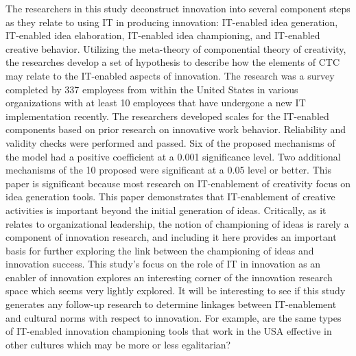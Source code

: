 \begin{adjustwidth}{1in}{}
  \begin{hangpara}{.25in}{1}
\end{hangpara}
\end{adjustwidth}
The researchers in this study deconstruct innovation into several component steps as they relate to using IT in producing innovation: IT-enabled idea generation, IT-enabled idea elaboration, IT-enabled idea championing, and IT-enabled creative behavior. Utilizing the meta-theory of componential theory of creativity, the researches develop a set of hypothesis to describe how the elements of CTC may relate to the IT-enabled aspects of innovation. The research was a survey completed by 337 employees from within the United States in various organizations with at least 10 employees that have undergone a new IT implementation recently. The researchers developed scales for the IT-enabled components based on prior research on innovative work behavior. Reliability and validity checks were performed and passed. Six of the proposed mechanisms of the model had a positive coefficient at a 0.001 significance level. Two additional mechanisms of the 10 proposed were significant at a 0.05 level or better. This paper is significant because most research on IT-enablement of creativity focus on idea generation tools. This paper demonstrates that IT-enablement of creative activities is important beyond the initial generation of ideas. Critically, as it relates to organizational leadership, the notion of championing of ideas is rarely a component of innovation research, and including it here provides an important basis for further exploring the link between the championing of ideas and innovation success. This study's focus on the role of IT in innovation as an enabler of innovation explores an interesting corner of the innovation research space which seems very lightly explored. It will be interesting to see if this study generates any follow-up research to determine linkages between IT-enablement and cultural norms with respect to innovation. For example, are the same types of IT-enabled innovation championing tools that work in the USA effective in other cultures which may be more or less egalitarian?



